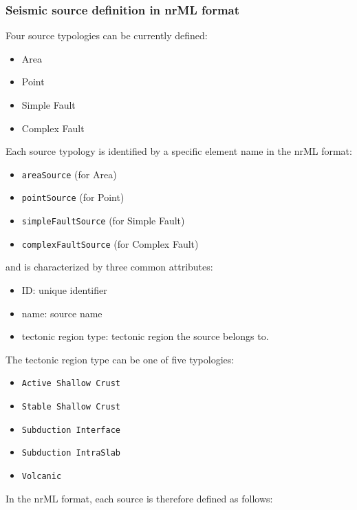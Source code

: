 \subsubsection{Seismic source definition in nrML format}
Four source typologies can be currently defined:
\begin{itemize}
\item Area
\item Point
\item Simple Fault
\item Complex Fault
\end{itemize}
Each source typology is identified by a specific element name in the nrML format:
\begin{itemize}
\item \Verb+areaSource+ (for Area)
\item \Verb+pointSource+ (for Point)
\item \Verb+simpleFaultSource+ (for Simple Fault)
\item \Verb+complexFaultSource+ (for Complex Fault)
\end{itemize}
and is characterized by three common attributes:
\begin{itemize}
\item ID: unique identifier 
\item name: source name
\item tectonic region type: tectonic region the source belongs to. 
\end{itemize}
The tectonic region type can be one of five typologies:
\begin{itemize}
\item \Verb+Active Shallow Crust+
\item \Verb+Stable Shallow Crust+
\item \Verb+Subduction Interface+
\item \Verb+Subduction IntraSlab+
\item \Verb+Volcanic+
\end{itemize}
In the nrML format, each source is therefore defined as follows:
